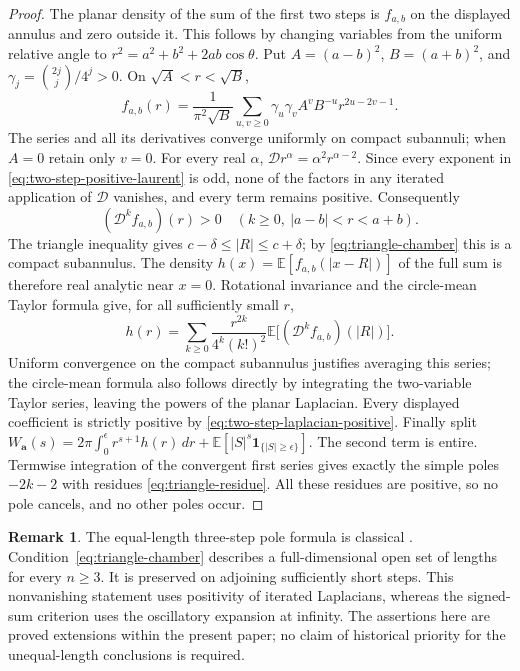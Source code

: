\documentclass[11pt]{amsart}
\theoremstyle{definition}
\newtheorem{remark}[thm]{Remark}
\begin{document}
\begin{proof}
The planar density of the sum of the first two steps is $f_{a,b}$ on
the displayed annulus and zero outside it. This follows by changing
variables from the uniform relative angle to
$r^2=a^2+b^2+2ab\cos\theta$.
Put $A=(a-b)^2$, $B=(a+b)^2$, and
$\gamma_j=\binom{2j}{j}/4^j>0$. On $\sqrt A<r<\sqrt B$,
\begin{equation}\label{eq:two-step-positive-laurent}
 f_{a,b}(r)
 =\frac1{\pi^2\sqrt B}
   \sum_{u,v\ge0}\gamma_u\gamma_v A^v B^{-u}
                       r^{2u-2v-1}.
\end{equation}
The series and all its derivatives converge uniformly on compact
subannuli; when $A=0$ retain only $v=0$.
For every real $\alpha$,
$\mathcal D r^\alpha=\alpha^2r^{\alpha-2}$.
Since every exponent in \eqref{eq:two-step-positive-laurent} is odd,
none of the factors in any iterated application of $\mathcal D$
vanishes, and every term remains positive. Consequently
\begin{equation}\label{eq:two-step-laplacian-positive}
 (\mathcal D^k f_{a,b})(r)>0
 \quad(k\ge0,\ |a-b|<r<a+b).
\end{equation}
The triangle inequality gives
$c-\delta\le |R|\le c+\delta$; by
\eqref{eq:triangle-chamber} this is a compact subannulus.
The density $h(x)=\mathbb E[f_{a,b}(|x-R|)]$ of the full sum is therefore
real analytic near $x=0$. Rotational invariance and the circle-mean
Taylor formula give, for all sufficiently small $r$,
\[
 h(r)=\sum_{k\ge0}\frac{r^{2k}}{4^k(k!)^2}
           \mathbb E\bigl[(\mathcal D^k f_{a,b})(|R|)\bigr].
\]
Uniform convergence on the compact subannulus justifies averaging this
series; the circle-mean formula also follows directly by integrating
the two-variable Taylor series, leaving the powers of the planar
Laplacian. Every displayed coefficient is strictly positive by
\eqref{eq:two-step-laplacian-positive}.
Finally split
$W_{\boldsymbol a}(s)=2\pi\int_0^\epsilon r^{s+1}h(r)\,dr+
\mathbb E[|S|^s\mathbf1_{\{|S|\ge\epsilon\}}]$.
The second term is entire. Termwise integration of the convergent first
series gives exactly the simple poles $-2k-2$ with residues
\eqref{eq:triangle-residue}. All these residues are positive, so no
pole cancels, and no other poles occur.
\end{proof}

\begin{remark}
The equal-length three-step pole formula is classical \cite{BNSW11,BSW13}. Condition~\eqref{eq:triangle-chamber} describes a full-dimensional open
set of lengths for every $n\ge3$. It is preserved on adjoining
sufficiently short steps. This nonvanishing statement uses positivity
of iterated Laplacians, whereas the signed-sum criterion uses the
oscillatory expansion at infinity. The assertions here are proved
extensions within the present paper; no claim of historical priority
for the unequal-length conclusions is required.
\end{remark}
\end{document}
